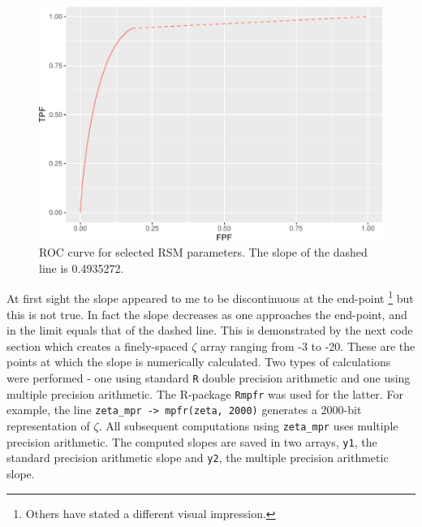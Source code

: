 \documentclass[
]{book}
\begin{document}
\begin{figure}
\centering
\includegraphics{07-rsm-predictions_files/figure-latex/rsm-pred-roc-plot-1.pdf}
\caption{\label{fig:rsm-pred-roc-plot}ROC curve for selected RSM parameters. The slope of the dashed line is 0.4935272.}
\end{figure}

At first sight the slope appeared to me to be discontinuous at the end-point \footnote{Others have stated a different visual impression.} but this is not true. In fact the slope decreases as one approaches the end-point, and in the limit equals that of the dashed line. This is demonstrated by the next code section which creates a finely-spaced \(\zeta\) array ranging from -3 to -20. These are the points at which the slope is numerically calculated. Two types of calculations were performed - one using standard \texttt{R} double precision arithmetic and one using multiple precision arithmetic. The R-package \texttt{Rmpfr} was used for the latter. For example, the line \texttt{zeta\_mpr\ -\textgreater{}\ mpfr(zeta,\ 2000)} generates a 2000-bit representation of \(\zeta\). All subsequent computations using \texttt{zeta\_mpr} uses multiple precision arithmetic. The computed slopes are saved in two arrays, \texttt{y1}, the standard precision arithmetic slope and \texttt{y2}, the multiple precision arithmetic slope.
\end{document}
